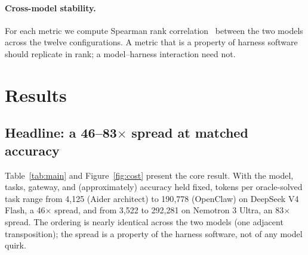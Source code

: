 \documentclass[11pt]{article}
\newcommand{\harness}[1]{\textsf{#1}}
\begin{document}
\paragraph{Cross-model stability.} For each metric we compute Spearman rank correlation~\citep{spearman1904} between the two models across the twelve configurations. A metric that is a property of harness software should replicate in rank; a model--harness interaction need not.

\section{Results}
\label{sec:results}

\subsection{Headline: a 46--83$\times$ spread at matched accuracy}
\label{sec:headline}

Table~\ref{tab:main} and Figure~\ref{fig:cost} present the core result. With the model, tasks, gateway, and (approximately) accuracy held fixed, tokens per oracle-solved task range from 4{,}125 (\harness{Aider} architect) to 190{,}778 (\harness{OpenClaw}) on DeepSeek V4 Flash, a 46$\times$ spread, and from 3{,}522 to 292{,}281 on Nemotron 3 Ultra, an 83$\times$ spread. The ordering is nearly identical across the two models (one adjacent transposition); the spread is a property of the harness software, not of any model quirk.
\end{document}
